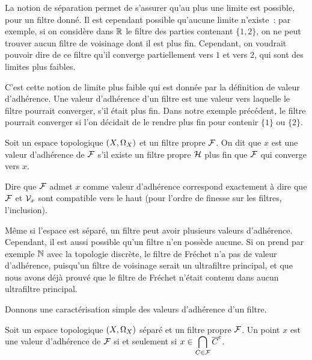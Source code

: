 La notion de séparation permet de s'assurer qu'au plus une limite est possible,
pour un filtre donné. Il est cependant possible qu'aucune limite n'existe~: par
exemple, si on considère dans $\mathbb R$ le filtre des parties contenant
$\{1,2\}$, on ne peut trouver aucun filtre de voisinage dont il est plus fin.
Cependant, on voudrait pouvoir dire de ce filtre qu'il converge partiellement
vers $1$ et vers $2$, qui sont des limites plus faibles.

C'est cette notion de limite plus faible qui est donnée par la définition de
valeur d'adhérence. Une valeur d'adhérence d'un filtre est une valeur vers
laquelle le filtre pourrait converger, s'il était plus fin. Dans notre exemple
précédent, le filtre pourrait converger si l'on décidait de le rendre plus fin
pour contenir $\{1\}$ ou $\{2\}$.

\begin{definition}
  Soit un espace topologique $(X,\Omega_{X})$ et un filtre propre $\mathcal{F}$. On
  dit que $x$ est une valeur d'adhérence de $\mathcal{F}$ s'il existe un filtre
  propre $\mathcal{H}$ plus fin que $\mathcal{F}$ qui converge vers $x$.
\end{definition}

\begin{remark}
  Dire que $\mathcal{F}$ admet $x$ comme valeur d'adhérence correspond exactement à
  dire que $\mathcal{F}$ et $\mathcal{V}_{x}$ sont compatible vers le haut (pour l'ordre
  de finesse sur les filtres,  l'inclusion).
\end{remark}

Même si l'espace est séparé, un filtre peut avoir plusieurs valeurs d'adhérence.
Cependant, il est aussi possible qu'un filtre n'en possède aucune. Si on prend
par exemple $\mathbb N$ avec la topologie discrète, le filtre de Fréchet n'a
pas de valeur d'adhérence, puisqu'un filtre de voisinage serait un ultrafiltre
principal, et que nous avons déjà prouvé que le filtre de Fréchet n'était
contenu dans aucun ultrafiltre principal.

\noindent
Donnons une caractérisation simple des valeurs d'adhérence d'un filtre.

\begin{proposition}\label{prop.carac.adh}
  Soit un espace topologique $(X,\Omega_{X})$ séparé et un filtre propre
  $\mathcal{F}$. Un point $x$ est une valeur d'adhérence de $\mathcal{F}$ si et
  seulement si $\displaystyle x\in \bigcap_{C\in\mathcal{F}} \overline{C}^{\mathrm c}$.
\end{proposition}

